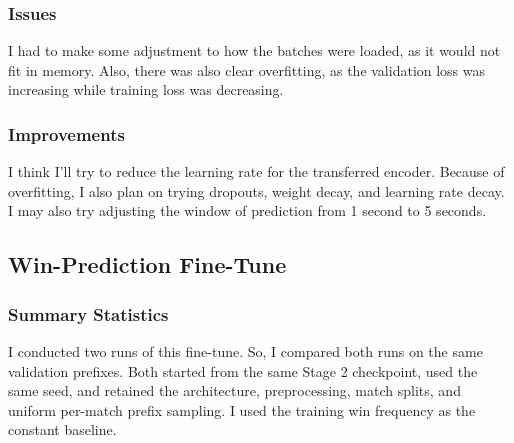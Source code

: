 \documentclass[11pt]{article}
\begin{document}
\subsubsection{Issues}
    I had to make some adjustment to how the batches were loaded, as it would not fit in memory. 
    Also, there was also clear overfitting, as the validation loss was increasing while training loss was decreasing.

\subsubsection{Improvements}
    I think I'll try to reduce the learning rate for the transferred encoder. Because of overfitting, I also plan on trying 
    dropouts, weight decay, and learning rate decay. I may also try adjusting the window of prediction from 1 second to 5 seconds.


\subsection{Win-Prediction Fine-Tune}
\subsubsection{Summary Statistics}
    I conducted two runs of this fine-tune. So, I compared both runs on the same validation prefixes. Both started from the 
    same Stage 2 checkpoint, used the same seed, and retained the architecture, preprocessing, match splits, and 
    uniform per-match prefix sampling. I used the training win frequency as the constant baseline.
\end{document}
